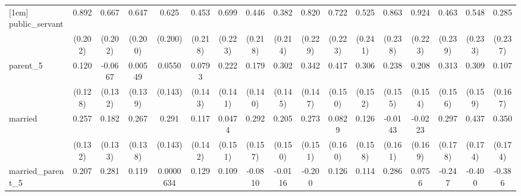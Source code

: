 {\begin{tabular}{l*{16}{c}}
[1em]
public\_servant      &       0.892\sym{***}&       0.667\sym{***}&       0.647\sym{**} &       0.625\sym{**} &       0.453\sym{*}  &       0.699\sym{**} &       0.446\sym{*}  &       0.382         &       0.820\sym{***}&       0.722\sym{**} &       0.525\sym{*}  &       0.863\sym{***}&       0.924\sym{***}&       0.463         &       0.548\sym{*}  &       0.285         \\
                    &     (0.202)         &     (0.202)         &     (0.200)         &     (0.200)         &     (0.218)         &     (0.223)         &     (0.218)         &     (0.214)         &     (0.229)         &     (0.223)         &     (0.241)         &     (0.238)         &     (0.223)         &     (0.239)         &     (0.233)         &     (0.237)         \\
[1em]
parent\_5            &       0.120         &     -0.0667         &     0.00549         &      0.0550         &      0.0793         &       0.222         &       0.179         &       0.302\sym{*}  &       0.342\sym{*}  &       0.417\sym{**} &       0.306\sym{*}  &       0.238         &       0.208         &       0.313\sym{*}  &       0.309         &       0.107         \\
                    &     (0.128)         &     (0.132)         &     (0.139)         &     (0.143)         &     (0.143)         &     (0.141)         &     (0.140)         &     (0.145)         &     (0.147)         &     (0.150)         &     (0.152)         &     (0.155)         &     (0.154)         &     (0.156)         &     (0.159)         &     (0.167)         \\
[1em]
married             &       0.257         &       0.182         &       0.267         &       0.291\sym{*}  &       0.117         &      0.0474         &       0.292         &       0.205         &       0.273         &      0.0829         &       0.126         &     -0.0143         &     -0.0223         &       0.297         &       0.437\sym{*}  &       0.350\sym{*}  \\
                    &     (0.132)         &     (0.133)         &     (0.138)         &     (0.143)         &     (0.142)         &     (0.151)         &     (0.157)         &     (0.150)         &     (0.151)         &     (0.160)         &     (0.158)         &     (0.161)         &     (0.169)         &     (0.178)         &     (0.174)         &     (0.174)         \\
[1em]
married\_parent\_5    &       0.207         &       0.281         &       0.119         &   0.0000634         &       0.129         &       0.109         &     -0.0810         &     -0.0116         &      -0.200         &       0.126         &       0.114         &       0.286         &      0.0756         &      -0.247         &      -0.400         &      -0.386         \\

\end{tabular}}
